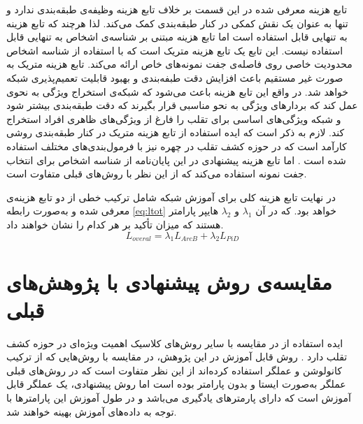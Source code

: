  تابع هزینه معرفی شده در این قسمت بر خلاف تابع هزینه
 وظیفه‌ی طبقه‌بندی ندارد و تنها به عنوان یک نقش کمکی در کنار طبقه‌بندی کمک می‌کند. لذا هرچند که تابع هزینه 
  به تنهایی قابل استفاده است اما تابع هزینه مبتنی بر شناسه‌ی اشخاص به تنهایی قابل استفاده نیست. این تابع یک تابع هزینه متریک است که با استفاده از شناسه اشخاص محدودیت خاصی روی فاصله‌ی جفت نمونه‌های خاص ارائه می‌کند. تابع هزینه متریک به صورت غیر مستقیم باعث افزایش دقت طبفه‌بندی و بهبود قابلیت تعمیم‌پذیری شبکه خواهد شد. در واقع این تابع هزینه باعث می‌شود که شبکه‌ی استخراج ویژگی به نحوی عمل کند که بردار‌های ویژگی به نحو مناسبی قرار بگیرند که دقت طبقه‌بندی بیشتر شود و شبکه ویژگی‌های اساسی برای تقلب را فارغ از ویژگی‌های ظاهری افراد استخراج کند. لازم به ذکر است که ایده استفاده از تابع هزینه متریک در کنار طبقه‌بندی روشی کارآمد است که در حوزه کشف تقلب در چهره نیز با فرمول‌بندی‌های مختلف استفاده شده است
\cite{shao2019multi,jia2020single,feng2020learning,perez2019deep,tu2020learning,xu2021improving}.
اما تابع هزینه پیشنهادی در این پایان‌نامه از شناسه اشخاص برای انتخاب جفت نمونه استفاده می‌کند که از این نظر با روش‌های قبلی متفاوت است.
  
  در نهایت تابع هزینه کلی برای آموزش شبکه شامل ترکیب خطی از دو تابع هزینه‌ی معرفی شده و به‌صورت رابطه
\ref{eq:ltot}
 خواهد بود. که در آن 
 $\lambda_1$
 و
 $\lambda_2$
   هایپر پارامتر هستند که میزان تأکید بر هر کدام را نشان خواهند داد.
\begin{equation}\label{eq:ltot}
	L_{overal} = \lambda_1L_{ArcB} + \lambda_2L_{PiD}
\end{equation}

\section{مقایسه‌ی روش پیشنهادی با پژوهش‌های قبلی}
ایده استفاده از 
در مقایسه با سایر روش‌های کلاسیک اهمیت ویژه‌ای در حوزه کشف تقلب دارد
\cite{maatta2011face,chingovska2012effectiveness,freitas2012lbp,rehman2020enhancing,li2019face,yu2020searching,zhang2020face}.
روش  قابل آموزش در این پژوهش، در مقایسه با روش‌هایی که از ترکیب کانولوشن و عملگر  استفاده کرده‌اند
\cite{li2019face,rehman2020enhancing}
از این نظر متفاوت است که در روش‌های قبلی عملگر  به‌صورت ایستا و بدون پارامتر بوده است اما روش پیشنهادی، یک عملگر قابل آموزش است که دارای پارمترهای یادگیری می‌باشد و در طول آموزش این پارامترها با توجه به داده‌های آموزش بهینه خواهند شد.

